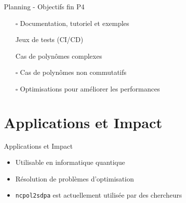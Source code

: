 \documentclass{beamer}
\begin{document}
\begin{frame}{Planning - Objectifs fin P4}

\begin{itemize}
    \item[$\square$] Documentation, tutoriel et exemples
    \item[\checkmark] Jeux de tests (CI/CD)
    \item[\checkmark] Cas de polynômes complexes
    \item[$\square$] Cas de polynômes non commutatifs
    \item[$\square$] Optimisations pour améliorer les performances
\end{itemize}
\end{frame}

\section{Applications et Impact}

\begin{frame}{Applications et Impact}
\begin{itemize}
    \item Utilisable en informatique quantique
    \item Résolution de problèmes d'optimisation
    \item \texttt{ncpol2sdpa} est actuellement utilisée par des chercheurs
\end{itemize}
\end{frame}
\end{document}
